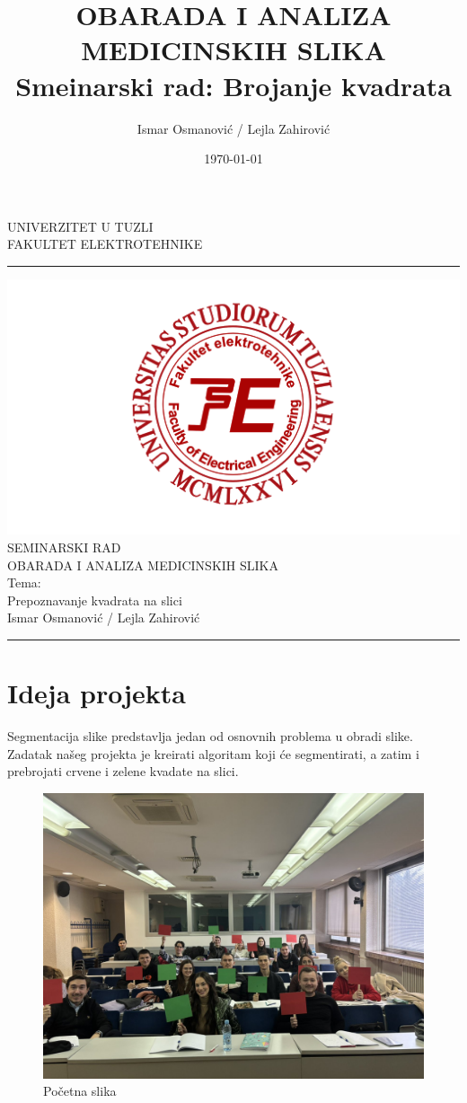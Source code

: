 \documentclass[a4paper,12pt]{article}
\title{OBARADA I ANALIZA MEDICINSKIH SLIKA \\ Smeinarski rad: Brojanje kvadrata}
\author{Ismar Osmanović / Lejla Zahirović}
\date{\today}
\begin{document}
\begin{center}
\thispagestyle{empty}
\large{UNIVERZITET U TUZLI \\ FAKULTET ELEKTROTEHNIKE}

\noindent\rule[7pt]{\linewidth}{0.4pt}


  \includegraphics[width=0.7\linewidth]{fet_logo.png}
\vspace{3cm}\\
{\fontsize{34pt}{28pt}\selectfont SEMINARSKI RAD}\\
\large{OBARADA I ANALIZA MEDICINSKIH SLIKA}\\
\vspace{2cm}
\Huge{Tema:}\\
\Huge{Prepoznavanje kvadrata na slici}\\
\vspace{0.5cm}
\large{Ismar Osmanović / Lejla Zahirović}
\vfill

\noindent\rule[7pt]{\linewidth}{0.4pt}
\end{center}
\newpage
\thispagestyle{empty}
\tableofcontents
\newpage
{} 

\section{Ideja projekta}
Segmentacija slike predstavlja jedan od osnovnih problema u obradi slike. 
Zadatak našeg projekta je kreirati algoritam koji će segmentirati, a zatim i prebrojati crvene i zelene kvadate na slici.
\begin{figure}[h]
    \centering
    \includegraphics[width=\textwidth]{../img/studenti.jpg}
    \caption{Početna slika}
    \label{fig:example}
\end{figure}
\newpage
\end{document}

